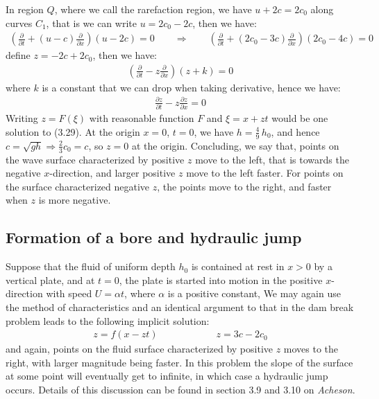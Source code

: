 \documentclass[11pt]{book}
\theoremstyle{break}
\theoremstyle{break}
\newcommand{\pd}{\partial}
\begin{document}
In region $Q$, where we call the rarefaction region, we have $u+2c = 2c_0$ along curves $C_1$, that is we can write $u = 2c_0 - 2c$, then we have:
\begin{align*}
\left(\frac{\partial}{\pd t}+(u-c) \frac{\pd}{\pd x}\right) (u-2c) = 0 \qquad \Rightarrow \qquad \left( \frac{\pd }{\pd t}+(2c_0 -3c)\frac{\pd}{\pd x}\right) (2c_0-4c) = 0
\end{align*}
define $z = -2c + 2c_0$, then we have:
\begin{align*}
\left( \frac{\pd}{\pd t} -z \frac{\pd}{\pd x}\right) (z+k) = 0
\end{align*}
where $k$ is a constant that we can drop when taking derivative, hence we have:
\begin{align}
\frac{\pd z}{\pd t } - z \frac{\pd z}{\pd x} = 0
\end{align}
Writing $z = F(\xi)$ with reasonable function $F$ and $\xi = x+zt$ would be one solution to (3.29). At the origin $x=0$, $t=0$, we have $h = \frac{4}{9}\, h_0$, and hence $c = \sqrt{gh} \Rightarrow \frac{2}{3}c_0 = c$, so $z = 0$ at the origin. Concluding, we say that, points on the wave surface characterized by positive $z$ move to the left, that is towards the negative $x$-direction, and larger positive $z$ move to the left faster. For points on the surface characterized negative $z$, the points move to the right, and faster when $z$ is more negative.  \\

\subsection*{Formation of a bore and hydraulic jump}
Suppose that the fluid of uniform depth $h_0$ is contained at rest in $x>0 $ by a vertical plate, and at $t=0$, the plate is started into motion in the positive $x$-direction with speed $U = \alpha t$, where $\alpha$ is a positive constant, We may again use the method of characteristics and an identical argument to that in the dam break problem leads to the following implicit solution:
\begin{align*}
z = f(x-zt) \qquad\qquad\qquad z= 3c-2c_0
\end{align*}
and again, points on the fluid surface characterized by positive $z$ moves to the right, with larger magnitude being faster. In this problem the slope of the surface at some point will eventually get to infinite, in which case a hydraulic jump occurs. Details of this discussion can be found in section 3.9 and 3.10 on \textit{Acheson}. \\
\end{document}
